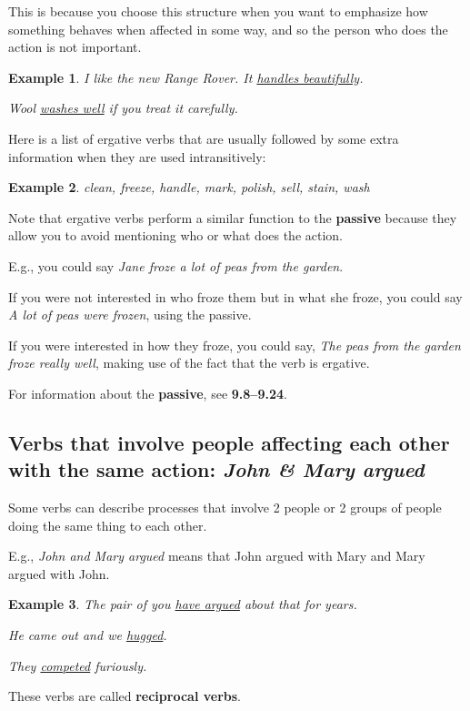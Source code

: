 \documentclass[oneside]{book}
\numberwithin{equation}{section}
\newtheorem{example}{Example}[section]
\begin{document}
This is because you choose this structure when you want to emphasize how something behaves when affected in some way, and so the person who does the action is not important.
\begin{example}
    I like the new Range Rover. It \underline{handles beautifully}.
    
    Wool \underline{washes well} if you treat it carefully.
\end{example}
Here is a list of ergative verbs that are usually followed by some extra information when they are used intransitively:
\begin{example}
    clean, freeze, handle, mark, polish, sell, stain, wash
\end{example}
%
\noindent{} Note that ergative verbs perform a similar function to the \textbf{passive} because they allow you to avoid mentioning who or what does the action.

E.g., you could say \textit{Jane froze a lot of peas from the garden}.

If you were not interested in who froze them but in what she froze, you could say \textit{A lot of peas were frozen}, using the passive.

If you were interested in how they froze, you could say, \textit{The peas from the garden froze really well}, making use of the fact that the verb is ergative.

%
For information about the \textbf{passive}, see \textbf{9.8--9.24}.

\subsection{Verbs that involve people affecting each other with the same action: \textit{John \& Mary argued}}
\noindent{} Some verbs can describe processes that involve 2 people or 2 groups of people doing the same thing to each other.

E.g., \textit{John and Mary argued} means that John argued with Mary and Mary argued with John.
\begin{example}
    The pair of you \underline{have argued} about that for years.
    
    He came out and we \underline{hugged}.
    
    They \underline{competed} furiously.
\end{example}
These verbs are called \textbf{reciprocal verbs}.
\end{document}

